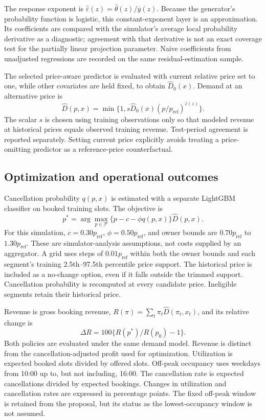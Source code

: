 The response exponent is $\widehat\varepsilon(z)=\widehat\theta(z)/\overline y(z)$. Because the generator's probability function is logistic, this constant-exponent layer is an approximation. Its coefficients are compared with the simulator's average local probability derivative as a diagnostic; agreement with that derivative is not an exact coverage test for the partially linear projection parameter. Naive coefficients from unadjusted regressions are recorded on the same residual-estimation sample.

The selected price-aware predictor is evaluated with current relative price set to one, while other covariates are held fixed, to obtain $\widehat D_0(x)$. Demand at an alternative price is
\begin{equation}
 \widehat D(p,x)=\min\{1,s\widehat D_0(x)(p/p_{\mathrm{ref}})^{\widehat\varepsilon(z)}\}.
\end{equation}
The scalar $s$ is chosen using training observations only so that modeled revenue at historical prices equals observed training revenue. Test-period agreement is reported separately. Setting current price explicitly avoids treating a price-omitting predictor as a reference-price counterfactual.

\subsection{Optimization and operational outcomes}
Cancellation probability $q(p,x)$ is estimated with a separate LightGBM classifier on booked training slots. The objective is
\begin{equation}
 p^*=\arg\max_{p\in\mathcal P}\{p-c-\phi q(p,x)\}\widehat D(p,x).
\end{equation}
For this simulation, $c=0.30p_{\mathrm{ref}}$, $\phi=0.50p_{\mathrm{ref}}$, and owner bounds are $0.70p_{\mathrm{ref}}$ to $1.30p_{\mathrm{ref}}$. These are simulator-analysis assumptions, not costs supplied by an aggregator. A grid uses steps of $0.01p_{\mathrm{ref}}$ within both the owner bounds and each segment's training 2.5th--97.5th percentile price support. The historical price is included as a no-change option, even if it falls outside the trimmed support. Cancellation probability is recomputed at every candidate price. Ineligible segments retain their historical price.

Revenue is gross booking revenue, $R(\pi)=\sum_t\pi_t\widehat D(\pi_t,x_t)$, and its relative change is
\begin{equation}
 \Delta R=100\{R(p^*)/R(p_0)-1\}.
\end{equation}
Both policies are evaluated under the same demand model. Revenue is distinct from the cancellation-adjusted profit used for optimization. Utilization is expected booked slots divided by offered slots. Off-peak occupancy uses weekdays from 10:00 up to, but not including, 16:00. The cancellation rate is expected cancellations divided by expected bookings. Changes in utilization and cancellation rates are expressed in percentage points. The fixed off-peak window is retained from the proposal, but its status as the lowest-occupancy window is not assumed.

